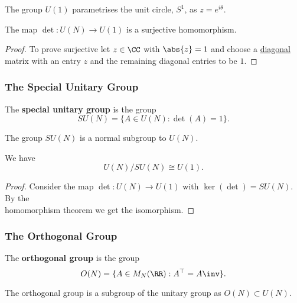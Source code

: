 \documentclass[12pt, a4paper]{article}
\begin{document}
\begin{mdnote}
    The group \(U(1)\) parametrises the unit circle, \(S^1\), as \(z=e^{i\theta}\).
\end{mdnote}

\begin{mdthm}
    The map \(\det : U(N) \to U(1)\) is a surjective homomorphism.
\end{mdthm}

\begin{proof}
    To prove surjective let \(z \in \CC\) with \(\abs{z}=1\) and choose a \ul{diagonal} matrix with an entry \(z\) and the remaining diagonal entries to be \(1\).
\end{proof}

\subsubsection{The Special Unitary Group}

\begin{definition}
    The \textbf{special unitary group} is the group 
    \[SU(N) = \{A\in U(N) : \det(A) =1\}.\]
\end{definition}

\begin{theorem}
    The group \(SU(N)\) is a normal subgroup to \(U(N)\).
\end{theorem}

\begin{corollary}
    We have 
    \[U(N) / SU(N) \cong U(1).\]
\end{corollary}

\begin{proof}
    Consider the map \(\det: U(N) \to U(1)\) with \(\ker(\det)=SU(N)\). By the \\ homomorphism theorem we get the isomorphism.
\end{proof}

\subsubsection{The Orthogonal Group}

\begin{definition}
    The \textbf{orthogonal group} is the group 
    \[O(N)=\{A \in M_N(\RR) : A^{\top} = A\inv\}.\]
\end{definition}

\begin{corollary}
    The orthogonal group is a subgroup of the unitary group as \(O(N) \subset U(N)\).
\end{corollary}
\end{document}
